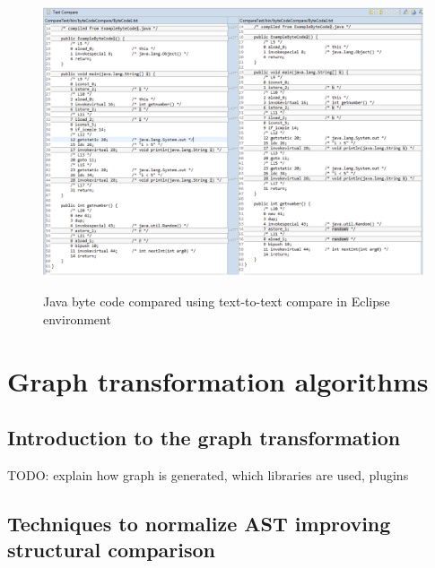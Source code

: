 \documentclass{report}
\begin{document}
\begin{figure}[h]
  \centering
  \includegraphics[scale = 0.55]{Figures/bytecode-compare/example-of-bytecode-text-compared}\\[0.1cm]
  \caption[Functions compared by members]{Java byte code compared using text-to-text compare in Eclipse environment}
  \label{fig:example-of-bytecode-text-compared}
\end{figure}



\chapter{Graph transformation algorithms}
\label{cha:graph-transformation}

\section{Introduction to the graph transformation}
\label{sec:graph-transformation}

TODO: explain how graph is generated, which libraries are used, plugins

\section{Techniques to normalize AST improving structural comparison}
\end{document}
